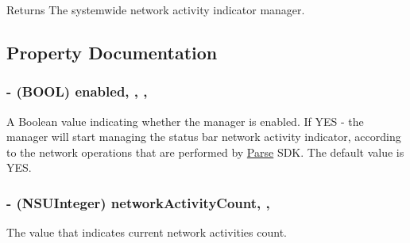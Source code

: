 \begin{DoxyReturn}{Returns}
The systemwide network activity indicator manager. 
\end{DoxyReturn}


\subsection{Property Documentation}
\hypertarget{interface_p_f_network_activity_indicator_manager_a8e06100fdf787d0dae5776108400d29e}{}
\subsubsection[{enabled}]{\setlength{\rightskip}{0pt plus 5cm}-\/ (B\+O\+O\+L) enabled\hspace{0.3cm}{\ttfamily [read]}, {\ttfamily [write]}, {\ttfamily [nonatomic]}, {\ttfamily [assign]}}\label{interface_p_f_network_activity_indicator_manager_a8e06100fdf787d0dae5776108400d29e}
A Boolean value indicating whether the manager is enabled. If {\ttfamily Y\+E\+S} -\/ the manager will start managing the status bar network activity indicator, according to the network operations that are performed by \hyperlink{interface_parse}{Parse} S\+D\+K. The default value is {\ttfamily Y\+E\+S}. \hypertarget{interface_p_f_network_activity_indicator_manager_ab52923fab090824b0bb2609b91b1e39b}{}
\subsubsection[{network\+Activity\+Count}]{\setlength{\rightskip}{0pt plus 5cm}-\/ (N\+S\+U\+Integer) network\+Activity\+Count\hspace{0.3cm}{\ttfamily [read]}, {\ttfamily [nonatomic]}, {\ttfamily [assign]}}\label{interface_p_f_network_activity_indicator_manager_ab52923fab090824b0bb2609b91b1e39b}
The value that indicates current network activities count. \hypertarget{interface_p_f_network_activity_indicator_manager_a1e3d2adc9c714d59c15b63df0f9e8c9a}{}
